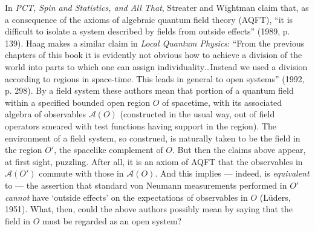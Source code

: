\documentclass[12pt]{article}
\newcommand{\alg}[1]{\mbox{$\mathcal{#1}$}}
\begin{document}
In \emph{PCT, Spin and Statistics, and All That}, Streater and Wightman 
claim that, as a consequence of the axioms of algebraic quantum 
field theory (AQFT), ``it is difficult 
to isolate a system described by fields from outside effects'' (1989, p. 
139). 
Haag makes a similar claim in \emph{Local Quantum Physics}: 
``From the previous chapters of this book it is evidently not obvious 
 how to achieve a division of the world into parts to which one can 
 assign individuality\ldots Instead we used a division according to 
 regions in space-time.  This leads in general to open systems'' (1992, 
p. 298).
By a field system these authors mean that portion of 
a quantum field within a specified bounded open region $O$ of 
spacetime, with its associated algebra of observables $\alg{A}(O)$ (constructed in 
the usual way, out of field operators smeared with test functions having 
support in the region).  The environment of a field system, 
so construed, is naturally taken to 
be the field in the region $O'$, the spacelike complement of $O$. 
But then the claims above appear, at first sight, puzzling.  After 
all, it 
is an axiom of AQFT that the observables in $\alg{A}(O')$
commute with those in $\alg{A}(O)$. And this implies --- indeed, is 
\emph{equivalent} to --- the 
assertion that standard von Neumann 
measurements performed in $O'$ \emph{cannot} have `outside effects' on the 
expectations of observables in $O$ (L\"{u}ders, 1951). What, then, could the above authors 
possibly mean by saying that the field in $O$ must be regarded as an open system?  
  
\end{document}
